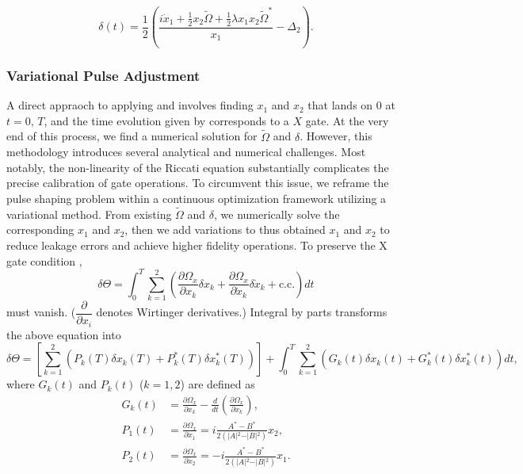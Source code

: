 \begin{equation}
  \delta(t) = \frac{1}{2} \left( \frac{i\dot{x}_1 + \frac{1}{2} x_2 \tilde{\Omega} + \frac{1}{2}\lambda x_1 x_2 \tilde{\Omega}^*}{x_1} - \Delta_2 \right) \label{eq:riccati_delta}.
\end{equation}

\subsubsection{Variational Pulse Adjustment}
A direct appraoch to applying  and  involves
finding $x_1$ and $x_2$ that lands on $0$ at $t=0,\,T$, and the time evolution given by 
corresponds to a $X$ gate.
At the very end of this process, we find a numerical solution for $\tilde{\Omega}$ and $\delta$.
However, this methodology introduces several analytical and numerical challenges.
Most notably, the non-linearity of the Riccati equation  substantially complicates
the precise calibration of gate operations.
To circumvent this issue, we reframe the pulse shaping problem within a continuous optimization framework utilizing a
variational method.
From existing $\tilde{\Omega}$ and $\delta$, we numerically solve the corresponding $x_1$ and $x_2$,
then we add variations to thus obtained $x_1$ and $x_2$ to reduce leakage errors and achieve higher fidelity operations.
To preserve the X gate condition ,
\begin{equation}
  \delta \Theta = \int_0^T \sum_{k=1}^2 \left( \frac{\partial \Omega_x}{\partial x_k} \delta x_k + \frac{\partial \Omega_x}{\partial \dot{x}_k} \delta \dot{x}_k + \text{c.c.} \right) dt
\end{equation}
must vanish. ($\dfrac{\partial}{\partial x_i}$ denotes Wirtinger derivatives.)
Integral by parts transforms the above equation into
\begin{equation}
  \delta \Theta = \left[ \sum_{k=1}^2 \left( P_k(T) \delta x_k(T) + P_k^*(T) \delta x_k^*(T) \right) \right] + \int_0^T \sum_{k=1}^2 \left( G_k(t) \delta x_k(t) + G_k^*(t) \delta x_k^*(t) \right) dt,
  \label{eq:riccati_variation}
\end{equation}
where $G_k(t)$ and $P_k(t)$ ($k=1,2$) are defined as
\begin{align*}
  G_k(t) & = \frac{\partial \Omega_x}{\partial x_k} - \frac{d}{dt} \left( \frac{\partial \Omega_x}{\partial \dot{x}_k} \right), \\
  P_1(t) & = \frac{\partial \Omega_x}{\partial \dot{x}_1} = i \frac{A^* - B^*}{2(\vert{}A\vert{}^2 - \vert{}B\vert{}^2)} x_2,   \\
  P_2(t) & = \frac{\partial \Omega_x}{\partial \dot{x}_2} = -i \frac{A^* - B^*}{2(\vert{}A\vert{}^2 - \vert{}B\vert{}^2)} x_1.
\end{align*}

